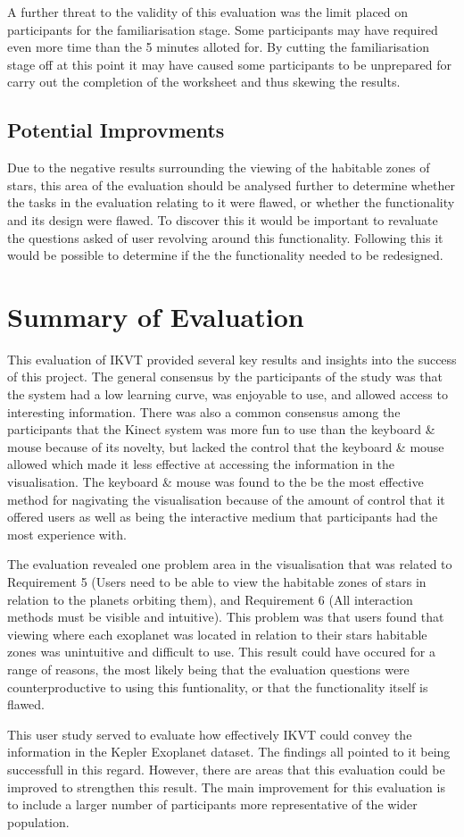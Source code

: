 A further threat to the validity of this evaluation was the limit placed on
participants for the familiarisation stage. Some participants may have required
even more time than the 5 minutes alloted for. By cutting the familiarisation
stage off at this point it may have caused some participants to be unprepared
for carry out the completion of the worksheet and thus skewing the results.

\subsection{Potential Improvments}
Due to the negative results surrounding the viewing of the habitable zones of
stars,
this area of the evaluation should be analysed further to determine whether the
tasks in the evaluation relating to it were flawed, or whether the functionality
and its design were flawed. To discover this it would be important to revaluate
the questions asked of user revolving around this functionality. Following this
it would be possible to determine if the the functionality needed to be
redesigned. 


\section{Summary of Evaluation}
This evaluation of IKVT provided several key results and insights into the
success of this project. The general consensus by the participants of the study
was that the system had a low learning curve, was enjoyable to use, and allowed
access to interesting information. There was also a common consensus among the
participants that the Kinect system was more fun to use than the keyboard \&
mouse because of its novelty, but lacked the control that the
keyboard \& mouse allowed which made it less effective at accessing the
information in the visualisation. The keyboard \& mouse was found to the be the
most effective method for nagivating the visualisation because of the amount of
control that it offered users as well as being the interactive medium that
participants had the most experience with.

The evaluation revealed one problem area in the visualisation that was related
to Requirement 5 (Users need to be able to view the habitable zones of stars in
relation to the planets orbiting them), and Requirement 6 (All interaction
methods must be visible and intuitive). This problem was that users found that
viewing where each exoplanet was located in relation to their stars habitable
zones was unintuitive and difficult to use. This result could have occured for a
range of reasons, the most likely being that the evaluation questions were
counterproductive to using this funtionality, or that the functionality itself
is flawed.

This user study served to evaluate how effectively IKVT could convey the
information in the Kepler Exoplanet dataset. The findings all pointed to it
being successfull in this regard. However, there are areas that this evaluation
could be improved to strengthen this result. The main improvement for this
evaluation is to include a larger number of participants more representative of
the wider population.



